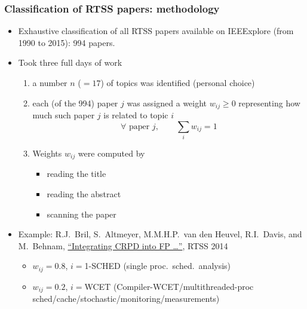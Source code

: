 \documentclass[ignorenonframetext,mathserif]{beamer} %
\begin{document}
\begin{frame}[fragile]
  \frametitle{Classification of RTSS papers: methodology}
  
  \begin{itemize}
  \item Exhaustive classification of all RTSS papers available on
    IEEExplore (from 1990 to 2015): 994 papers.  
  \item Took three full days of work
    \begin{enumerate}
    \item a number $n$ ($=17$) of topics was identified (personal
      choice)
    \item each (of the 994) paper $j$ was assigned a weight
      $w_{ij}\geq 0$ representing how much such paper $j$ is related
      to topic $i$
      \[
      \forall \text{ paper } j,\qquad\sum_i w_{ij}= 1
      \]
    \item Weights $w_{ij}$ were computed by
      \begin{itemize}
      \item reading the title %
      \item reading the abstract %
      \item scanning the paper %
      \end{itemize}
    \end{enumerate}
  \item Example: R.J.~Bril, S.~Altmeyer, M.M.H.P.~van den Heuvel,
    R.I.~Davis, and M.~Behnam,
    \href{https://ieeexplore.ieee.org/stamp/stamp.jsp?tp=&arnumber=7010484}
    {``Integrating CRPD into FP \dots''}, RTSS 2014
    \begin{itemize}
    \item $w_{ij}=0.8$, $i=$1-SCHED (single proc.~sched.~analysis)
    \item $w_{ij}=0.2$, $i=$WCET (Compiler-WCET/multithreaded-proc
      sched/cache/stochastic/monitoring/measurements)
    \end{itemize}
  \end{itemize}
\end{frame}
\end{document}
